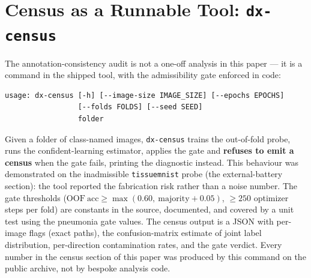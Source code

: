 
\section{Census as a Runnable Tool: \texttt{dx-census}}
\label{sec:dxcensus}
The annotation-consistency audit is not a one-off analysis in this paper --- it is a
command in the shipped tool, with the admissibility gate enforced in code:
\begin{verbatim}
usage: dx-census [-h] [--image-size IMAGE_SIZE] [--epochs EPOCHS]
                 [--folds FOLDS] [--seed SEED]
                 folder
\end{verbatim}
Given a folder of class-named images, \texttt{dx-census} trains the
out-of-fold probe, runs the confident-learning estimator, applies the gate
and \textbf{refuses to emit a census} when the gate fails, printing the
diagnostic instead. This behaviour was demonstrated on the inadmissible
\texttt{tissuemnist} probe (the external-battery section): the tool reported the
fabrication risk rather than a noise number. The gate thresholds
($\mathrm{OOF\ acc}\ge\max(0.60,\ \mathrm{majority}+0.05)$, $\ge 250$
optimizer steps per fold) are constants in the source, documented, and
covered by a unit test using the pneumonia gate values.
The census output is a JSON with per-image flags (exact paths), the
confusion-matrix estimate of joint label distribution, per-direction
contamination rates, and the gate verdict. Every number in
the census section of this paper was produced by this command on the
public archive, not by bespoke analysis code.

